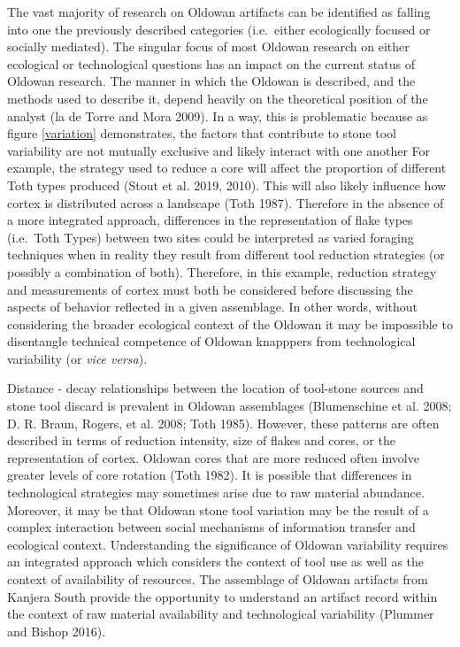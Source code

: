 \documentclass[]{elsarticle} %
\begin{document}
The vast majority of research on Oldowan artifacts can be identified as
falling into one the previously described categories (i.e.~either
ecologically focused or socially mediated). The singular focus of most
Oldowan research on either ecological or technological questions has an
impact on the current status of Oldowan research. The manner in which
the Oldowan is described, and the methods used to describe it, depend
heavily on the theoretical position of the analyst (la de Torre and Mora
2009). In a way, this is problematic because as figure \ref{variation}
demonstrates, the factors that contribute to stone tool variability are
not mutually exclusive and likely interact with one another For example,
the strategy used to reduce a core will affect the proportion of
different Toth types produced (Stout et al. 2019, 2010). This will also
likely influence how cortex is distributed across a landscape (Toth
1987). Therefore in the absence of a more integrated approach,
differences in the representation of flake types (i.e.~Toth Types)
between two sites could be interpreted as varied foraging techniques
when in reality they result from different tool reduction strategies (or
possibly a combination of both). Therefore, in this example, reduction
strategy and measurements of cortex must both be considered before
discussing the aspects of behavior reflected in a given assemblage. In
other words, without considering the broader ecological context of the
Oldowan it may be impossible to disentangle technical competence of
Oldowan knapppers from technological variability (or \emph{vice versa}).

Distance - decay relationships between the location of tool-stone
sources and stone tool discard is prevalent in Oldowan assemblages
(Blumenschine et al. 2008; D. R. Braun, Rogers, et al. 2008; Toth 1985).
However, these patterns are often described in terms of reduction
intensity, size of flakes and cores, or the representation of cortex.
Oldowan cores that are more reduced often involve greater levels of core
rotation (Toth 1982). It is possible that differences in technological
strategies may sometimes arise due to raw material abundance. Moreover,
it may be that Oldowan stone tool variation may be the result of a
complex interaction between social mechanisms of information transfer
and ecological context. Understanding the significance of Oldowan
variability requires an integrated approach which considers the context
of tool use as well as the context of availability of resources. The
assemblage of Oldowan artifacts from Kanjera South provide the
opportunity to understand an artifact record within the context of raw
material availability and technological variability (Plummer and Bishop
2016).
\end{document}
